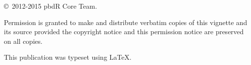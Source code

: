
\null
\vfill
\copyright\ 2012-2015 pbdR Core Team.

Permission is granted to make and distribute verbatim copies of
this vignette and its source provided the copyright notice and
this permission notice are preserved on all copies.

This publication was typeset using \LaTeX.
